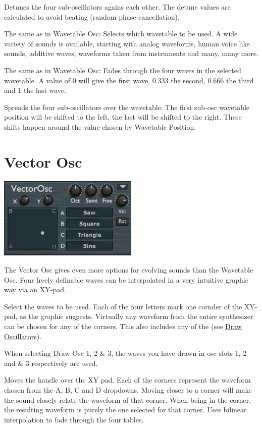 {Detunes the four sub-oscillators agains each other. The detune values are calculated to avoid beating (random phase-cancellation).}

{The same as in Wavetable Osc: Selects which wavetable to be used. A wide variety of sounds is available, starting with analog waveforms, human voice like sounds, additive waves, waveforms taken from instruments and many, many more.}

{The same as in Wavetable Osc: Fades through the four waves in the selected wavetable. A value of $0$ will give the first wave, $0.333$ the second, $0.666$ the third and $1$ the last wave.}

{Spreads the four sub-oscillators over the wavetable: The first sub-osc wavetable position will be shifted to the left, the last will be shifted to the right. These shifts happen around the value chosen by Wavetable Position.}

\section{Vector Osc}
\begin{center}
    \includegraphics[width=0.5\textwidth]{graphics/vector_osc.png}
\end{center}
The Vector Osc gives even more options for evolving sounds than the Wavetable Osc. Four freely definable waves can be interpolated in a very intuitive graphic way via an XY-pad.

{Select the waves to be used. Each of the four letters mark one cornder of the XY-pad, as the graphic suggests. Virtually any waveform from the entire synthesizer can be chosen for any of the corners. This also includes any of the (see \hyperref[wavedraw]{Draw Oscillators}).

When selecting  Draw Osc 1, 2 \& 3, the waves you have drawn in osc slots 1, 2 and \& 3 respectively are used.}

{Moves the handle over the XY pad. Each of the corners represent the waveform chosen from the A, B, C and D dropdowns. Moving closer to a corner will make the sound closely relate the waveform of that corner. When being in the corner, the resulting waveform is purely the one selected for that corner. Uses bilinear interpolation to fade through the four tables.}

